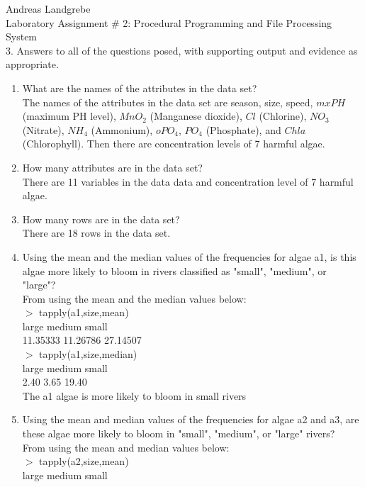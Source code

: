 \documentclass{article}
\begin{document}
\noindent
Andreas Landgrebe
\\
Laboratory Assignment \# 2: Procedural Programming and File Processing System
\\
3. Answers to all of the questions posed, with supporting output and evidence as appropriate.
\\
\begin{enumerate}
\item What are the names of the attributes in the data set?
\\
The names of the attributes in the data set are season, size, speed, $mxPH$ (maximum PH level), $MnO_2$ (Manganese dioxide), $Cl$ (Chlorine), $NO_3$ (Nitrate), $NH_4$ (Ammonium), $oPO_4$, $PO_4$ (Phosphate), and $Chla$ (Chlorophyll). Then there are concentration levels of 7 harmful algae.
\\
\item How many attributes are in the data set?
\\
There are 11 variables in the data data and concentration level of 7 harmful algae.
\\
\item How many rows are in the data set?
\\
There are 18 rows in the data set.
\\
\item Using the mean and the median values of the frequencies for algae a1, is this algae more likely to bloom in rivers classified as "small", "medium", or "large"?
\\
From using the mean and the median values below:
\\
$>$ tapply(a1,size,mean)
\\
   large   medium    small 
\\
11.35333 11.26786 27.14507 
\\
$>$ tapply(a1,size,median)
\\
 large medium  small
\\
  2.40   3.65  19.40 
\\
The a1 algae is more likely to bloom in small rivers  
\\
\item Using the mean and median values of the frequencies for algae a2 and a3, are these algae more likely to bloom in "small", "medium", or "large" rivers?
\\
From using the mean and median values below:
\\
$>$ tapply(a2,size,mean)
\\
    large    medium     small 
\\

\end{enumerate}
\end{document}
